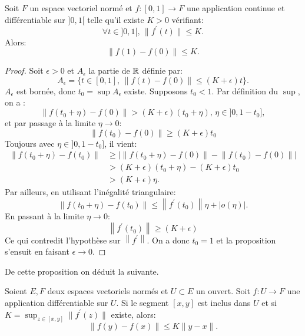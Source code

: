 \begin{prop}
  \label{prop:borne_accroissement}
Soit $F$ un espace vectoriel normé et $f \colon [0,1] \to F$ une application continue et différentiable sur $]0,1[$ telle qu'il existe
$K> 0$ vérifiant:
\begin{equation}
  \forall t \in ]0,1[, \, \| f^\prime(t) \| \leq K.
\end{equation}
Alors:
\begin{equation}
  \| f(1)-f(0) \| \leq K.
\end{equation}
\end{prop}
\begin{proof}
Soit $\epsilon > 0$ et $A_\epsilon$ la partie de $\mathbb R$ définie par:
\begin{equation}
  A_\epsilon = \{ t \in [0,1], \, \|f(t)-f(0) \| \leq (K+\epsilon) t \}.
\end{equation}
$A_\epsilon$ est bornée, donc $t_0= \sup A_\epsilon$ existe. Supposons $t_0 < 1$. Par définition du $\sup$, on a :
\begin{equation}
  \|f(t_0+\eta)-f(0) \| > (K+\epsilon) (t_0 + \eta), \, \eta \in ]0,1-t_0],
\end{equation}
et par passage à la limite $\eta \to 0$:
\begin{equation}
  \|f(t_0)-f(0) \| \geq (K+\epsilon) t_0
\end{equation}
Toujours avec $\eta \in ]0,1-t_0]$, il vient:
\begin{align}
  \left \| f(t_0+\eta)-f(t_0)  \right \| & \geq \lvert\left \| f(t_0+\eta)-f(0) \right \| - \left \| f(t_0) - f(0) \right \| \rvert \\
  & > (K+\epsilon)(t_0+\eta) - (K+\epsilon)t_0 \\
  & > (K+\epsilon)\eta. 
\end{align}
Par ailleurs, en utilisant l'inégalité triangulaire:
\begin{equation}
  \left \| f(t_0+\eta)-f(t_0)  \right \| \leq \left \| f^\prime(t_0)\right \|\eta + \lvert o(\eta) \rvert.
\end{equation}
En passant à la limite $\eta \to 0$:
\begin{equation}
  \left \| f^\prime(t_0)\right \| \geq (K+\epsilon)
\end{equation}
Ce qui contredit l'hypothèse sur  $\left \| f^\prime\right \|.$ On a donc $t_0=1$ et la proposition s'ensuit en faisant $\epsilon \to 0.$
\end{proof}
De cette proposition on déduit la suivante.
\begin{fthm}
  \label{thm:accroissements_finis}
Soient $E,F$ deux espaces vectoriels normés et $U\subset E$ un ouvert. Soit $f \colon U \to F$ une application différentiable sur $U.$
Si le segment $[x,y]$ est inclus dans $U$ et si $K=\sup_{z \in [x,y]} \|f^\prime(z)\|$ existe, alors:
\begin{equation}
  \| f(y)-f(x) \| \leq K \|y-x\|.
\end{equation}
\end{fthm}
